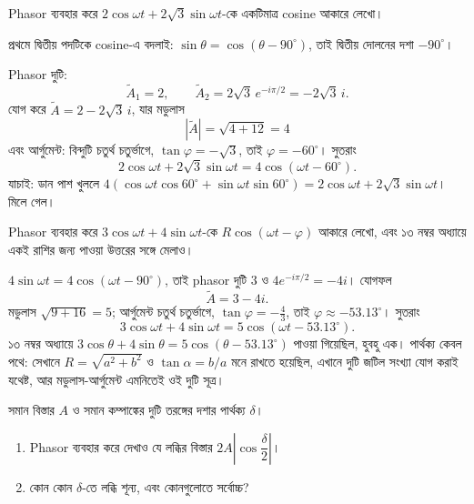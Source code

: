 \documentclass[11pt]{article}
\begin{document}
\begin{example}
Phasor ব্যবহার করে $2\cos\omega t + 2\sqrt{3}\sin\omega t$-কে একটিমাত্র
cosine আকারে লেখো।
\end{example}

\begin{solbox}
প্রথমে দ্বিতীয় পদটিকে cosine-এ বদলাই: $\sin\theta =
\cos\left( \theta - 90^{\circ} \right)$, তাই দ্বিতীয় দোলনের দশা
$-90^{\circ}$।

Phasor দুটি:
\[
  \tilde{A}_{1} = 2, \qquad
  \tilde{A}_{2} = 2\sqrt{3}\,e^{-i\pi/2} = -2\sqrt{3}\,i .
\]
যোগ করে $\tilde{A} = 2 - 2\sqrt{3}\,i$, যার মডুলাস
\[
  |\tilde{A}| = \sqrt{4 + 12} = 4
\]
এবং আর্গুমেন্ট: বিন্দুটি চতুর্থ চতুর্ভাগে, $\tan\varphi = -\sqrt{3}$, তাই
$\varphi = -60^{\circ}$। সুতরাং
\[
  2\cos\omega t + 2\sqrt{3}\sin\omega t = 4\cos\left( \omega t
  - 60^{\circ} \right) .
\]
যাচাই: ডান পাশ খুললে $4\left( \cos\omega t\cos 60^{\circ}
+ \sin\omega t\sin 60^{\circ} \right) = 2\cos\omega t
+ 2\sqrt{3}\sin\omega t$। মিলে গেল।
\end{solbox}

 Phasor ব্যবহার করে $3\cos\omega t + 4\sin\omega t$-কে
$R\cos(\omega t - \varphi)$ আকারে লেখো, এবং ১৩ নম্বর অধ্যায়ে একই রাশির
জন্য পাওয়া উত্তরের সঙ্গে মেলাও।

\begin{sol}
$4\sin\omega t = 4\cos\left( \omega t - 90^{\circ} \right)$, তাই phasor দুটি
$3$ ও $4e^{-i\pi/2} = -4i$। যোগফল
\[
  \tilde{A} = 3 - 4i .
\]
মডুলাস $\sqrt{9+16} = 5$; আর্গুমেন্ট চতুর্থ চতুর্ভাগে,
$\tan\varphi = -\tfrac{4}{3}$, তাই $\varphi \approx -53.13^{\circ}$। সুতরাং
\[
  3\cos\omega t + 4\sin\omega t = 5\cos\left( \omega t - 53.13^{\circ}
  \right) .
\]
১৩ নম্বর অধ্যায়ে $3\cos\theta + 4\sin\theta = 5\cos(\theta -
53.13^{\circ})$ পাওয়া গিয়েছিল, হুবহু এক। পার্থক্য কেবল পথে: সেখানে
$R = \sqrt{a^{2}+b^{2}}$ ও $\tan\alpha = b/a$ মনে রাখতে হয়েছিল, এখানে দুটি
জটিল সংখ্যা যোগ করাই যথেষ্ট, আর মডুলাস-আর্গুমেন্ট এমনিতেই ওই দুটি সূত্র।
\end{sol}

 সমান বিস্তার $A$ ও সমান কম্পাঙ্কের দুটি তরঙ্গের দশার পার্থক্য
$\delta$।
\begin{enumerate}
  \item Phasor ব্যবহার করে দেখাও যে লব্ধির বিস্তার
        $2A\left| \cos\dfrac{\delta}{2} \right|$।
  \item কোন কোন $\delta$-তে লব্ধি শূন্য, এবং কোনগুলোতে সর্বোচ্চ?
\end{enumerate}
\end{document}
